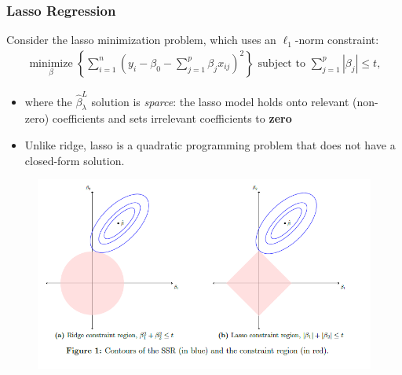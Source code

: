 \begin{frame}[fragile]
    \frametitle{Lasso Regression}
    Consider the lasso minimization problem, which uses an $\ell_1$-norm constraint:
    \begin{align}
    \label{eqn:eqn5}
    \underset{\beta}{\operatorname{minimize}}\left\{\sum_{i=1}^{n}\left(y_{i}-\beta_{0}-\sum_{j=1}^{p} \beta_{j} x_{i j}\right)^{2}\right\} \text { subject to } \sum_{j=1}^{p}\left|\beta_{j}\right| \leq t,
    \end{align}
    \begin{itemize}
        \item where the $\hat{\beta}_{\lambda}^{L}$ solution is \textit{sparce}: the lasso model holds onto relevant (non-zero) coefficients and sets irrelevant coefficients to \textbf{zero} %
        \item Unlike ridge, lasso is a quadratic programming problem that does not have a closed-form solution.
    \end{itemize}
\end{frame}
\begin{frame}[fragile]
        \begin{figure}[b]
        \includegraphics[scale=0.65]{Img/contours.png}\hspace{-1.2cm}
        \centering
    \end{figure}
\end{frame}
